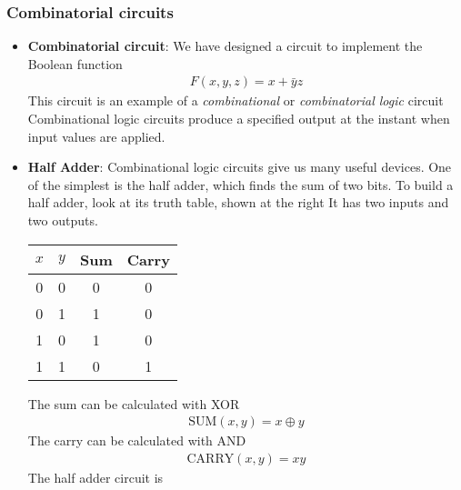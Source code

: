 \documentclass{report}
\begin{document}
    \subsubsection{Combinatorial circuits}
    \begin{itemize}
        \item \textbf{Combinatorial circuit}: We have designed a circuit to implement the Boolean function
            \begin{align*}
                F(x,y,z) = x + \bar{y}z
            \end{align*}
            This circuit is an example of a \textit{combinational} or \textit{combinatorial logic} circuit
            \bigbreak \noindent 
            Combinational logic circuits produce a specified output at the instant when input values are applied.
        \item \textbf{Half Adder}: Combinational logic circuits give us many useful devices.
            \bigbreak \noindent 
            One of the simplest is the half adder, which finds the sum of two bits.
            \bigbreak \noindent 
            To build a half adder, look at its truth table, shown at the right
            \bigbreak \noindent 
            It has two inputs and two outputs.
            \begin{center}
                \begin{center}
                    \begin{tabular}{cc|cc}
                        $x$&$y$&Sum&Carry \\ 
                        \hline
                        0 & 0 & 0 & 0 \\
                        0 & 1 & 1 & 0 \\
                        1 & 0 & 1 & 0 \\
                        1 & 1 & 0 & 1
                    \end{tabular}
                \end{center}
            \end{center}
            The sum can be calculated with XOR
            \begin{align*}
                \text{SUM}(x,y) = x \oplus y
            \end{align*}
            The carry can be calculated with AND
            \begin{align*}
                \text{CARRY}(x,y) = xy
            \end{align*}
            The half adder circuit is 
            \bigbreak \noindent 

\end{itemize}
\end{document}

